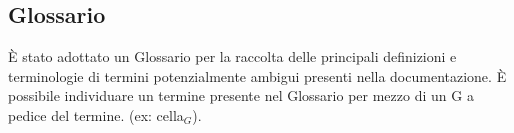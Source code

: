 \subsection{Glossario}
È stato adottato un Glossario per la raccolta delle principali definizioni e terminologie di termini potenzialmente ambigui presenti nella documentazione.  
È possibile individuare un termine presente nel Glossario per mezzo di un G a pedice del termine.  
(ex: cella\(_G\)).